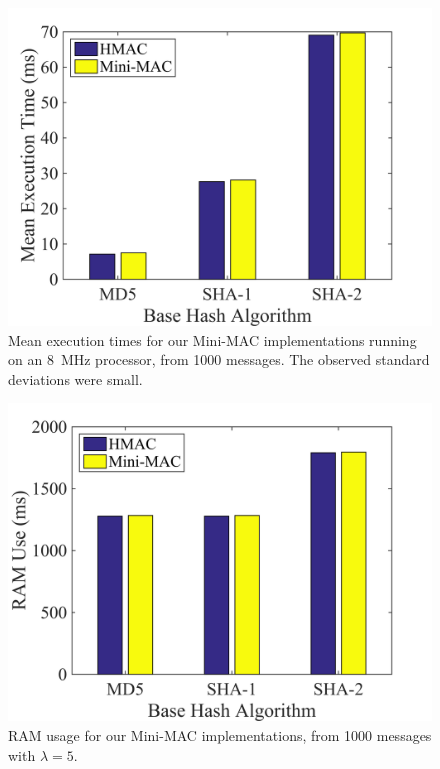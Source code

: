 	\begin{figure}
		\centering
		\includegraphics[width=\columnwidth]{figures/exec_cycles.png}
		\caption{Mean execution times for our Mini-MAC implementations running on an 8~MHz processor,
		from 1000 messages.  The observed standard deviations were small.}
		\label{fig-execution}
	\end{figure}
	
	\begin{figure}
		\centering
		\includegraphics[width=\columnwidth]{figures/ram_usage.png}
		\caption{RAM usage for our Mini-MAC implementations, from 1000 messages with $\lambda=5$.}
		\label{fig-ram}
	\end{figure}
	
